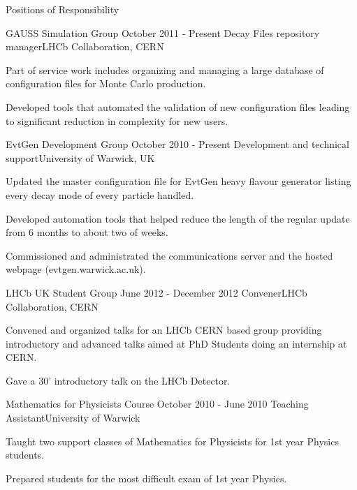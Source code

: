 \documentclass{format/resume} %
\begin{document}
\begin{rSection}{Positions of Responsibility}

\begin{rSubsection}{GAUSS Simulation Group}{ October 2011 - Present
  }{Decay Files repository manager}{LHCb Collaboration, CERN}
\item Part of service work includes organizing and managing a large database of configuration files for Monte Carlo production.
\item Developed tools that automated the validation of new
  configuration files leading to significant reduction in
  complexity for new users.
\end{rSubsection}

\begin{rSubsection}{EvtGen Development Group}{ October 2010 - Present }{Development and technical support}{University of Warwick, UK}
\item Updated the master configuration file for EvtGen heavy flavour
  generator listing every decay mode of every particle handled.
\item Developed automation tools that helped reduce the length of the
  regular update from 6 months to about two of weeks.
\item Commissioned and administrated the communications server and the hosted webpage (evtgen.warwick.ac.uk).
\end{rSubsection}

\begin{rSubsection}{LHCb UK Student Group}{ June 2012 - December 2012 }{Convener}{LHCb Collaboration, CERN}
\item Convened and organized talks for an LHCb CERN based group providing introductory and advanced talks aimed at PhD Students doing an internship at CERN.
\item Gave a 30' introductory talk on the LHCb Detector.
\end{rSubsection}

\begin{rSubsection}{Mathematics for Physicists Course}{ October 2010 - June 2010
  }{Teaching Assistant}{University of Warwick}
\item Taught two support classes of Mathematics for Physicists for 1st
  year Physics students.
\item Prepared students for the most difficult exam of 1st year Physics.
\end{rSubsection}


\end{rSection}
\end{document}
